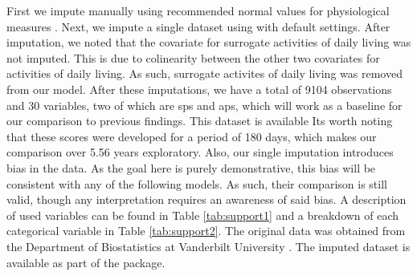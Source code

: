 \documentclass[
]{jss}
\begin{document}
First we impute manually using recommended normal values for
physiological measures \citep{harrell_2020}. Next, we impute a single
dataset using  with default settings. After imputation, we
noted that the covariate for surrogate activities of daily living was
not imputed. This is due to colinearity between the other two covariates
for activities of daily living. As such, surrogate activites of daily
living was removed from our model. After these imputations, we have a
total of 9104 observations and 30 variables, two of which are sps and
aps, which will work as a baseline for our comparison to previous
findings. This dataset is available Its worth noting that these scores
were developed for a period of 180 days, which makes our comparison over
5.56 years exploratory. Also, our single imputation introduces bias in
the data. As the goal here is purely demonstrative, this bias will be
consistent with any of the following models. As such, their comparison
is still valid, though any interpretation requires an awareness of said
bias. A description of used variables can be found in Table
\ref{tab:support1} and a breakdown of each categorical variable in Table
\ref{tab:support2}. The original data was obtained from the Department
of Biostatistics at Vanderbilt University \citep{harrell_2020}. The
imputed dataset is available as part of the  package.
\end{document}
